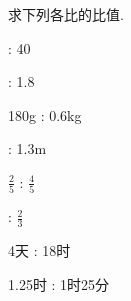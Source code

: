 求下列各比的比值.

\begin{subquestions}

     : 40 

     : 1.8 

    \subquestion 180g : 0.6kg 

    \subquestion 169cm : 1.3m

    $\frac{2}{5}$ : $\frac{4}{5}$ 

     : $\frac{2}{3}$    

    \subquestion 4天 : 18时    

    \subquestion 1.25时 : 1时25分 

\end{subquestions}





